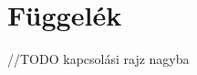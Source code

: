 \documentclass[../main.tex]{subfiles}
\begin{document}
\section{Függelék}
    //TODO kapcsolási rajz nagyba
\end{document}
